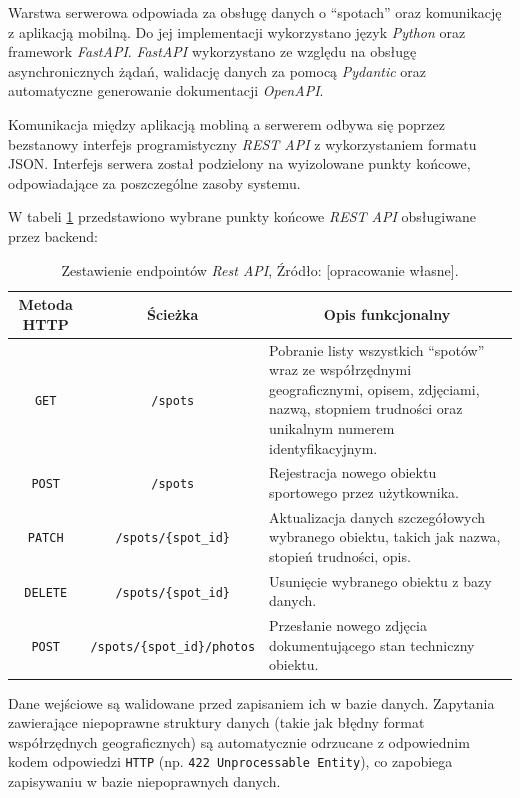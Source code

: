         Warstwa serwerowa odpowiada za obsługę danych o \enquote{spotach} oraz komunikację z aplikacją mobilną. Do jej implementacji wykorzystano język \textit{Python} oraz framework \textit{FastAPI}. \textit{FastAPI} wykorzystano ze względu na obsługę asynchronicznych żądań, walidację danych za pomocą \textit{Pydantic} oraz automatyczne generowanie dokumentacji \textit{OpenAPI}.

        Komunikacja między aplikacją mobliną a serwerem odbywa się poprzez bezstanowy interfejs programistyczny \textit{REST API} z wykorzystaniem formatu JSON. Interfejs serwera został podzielony na wyizolowane punkty końcowe, odpowiadające za poszczególne zasoby systemu.

        W tabeli \ref{tab:endpoints} przedstawiono wybrane punkty końcowe \textit{REST API} obsługiwane przez backend:

        \begin{table}[!h] \centering
            \caption{Zestawienie endpointów \textit{Rest API}, Źródło: [opracowanie własne].}
            \label{tab:endpoints} 
            \begin{tabularx}{\textwidth}{ | c | c | X | } \hline
                \textbf{Metoda HTTP} & \textbf{Ścieżka} & \multicolumn{1}{c|}{\textbf{Opis funkcjonalny}} \\ \hline
                \texttt{GET} & \texttt{/spots} & Pobranie listy wszystkich \enquote{spotów} wraz ze współrzędnymi geograficznymi, opisem, zdjęciami, nazwą, stopniem trudności oraz unikalnym numerem identyfikacyjnym. \\ \hline
                \texttt{POST} & \texttt{/spots} & Rejestracja nowego obiektu sportowego przez użytkownika. \\ \hline
                \texttt{PATCH} & \texttt{/spots/\{spot\_id\}} & Aktualizacja danych szczegółowych wybranego obiektu, takich jak nazwa, stopień trudności, opis. \\ \hline
                \texttt{DELETE} & \texttt{/spots/\{spot\_id\}} & Usunięcie wybranego obiektu z bazy danych. \\ \hline
                \texttt{POST} & \texttt{/spots/\{spot\_id\}/photos} & Przesłanie nowego zdjęcia dokumentującego stan techniczny obiektu. \\ \hline
            \end{tabularx}
        \end{table}

        Dane wejściowe są walidowane przed zapisaniem ich w bazie danych. Zapytania zawierające niepoprawne struktury danych (takie jak błędny format współrzędnych geograficznych) są automatycznie odrzucane z odpowiednim kodem odpowiedzi \texttt{HTTP} (np. \texttt{422 Unprocessable Entity}), co zapobiega zapisywaniu w bazie niepoprawnych danych.

